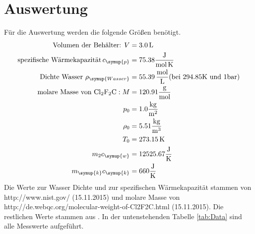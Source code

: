 \section{Auswertung}
\label{sec:Auswertung}
Für die Auswertung werden die folgende Größen benötigt.
\begin{align*}
  \text{Volumen der Behälter: } V &= 3.0 \,\si{\liter} \\
  \text{spezifische Wärmekapazität}\, c_\symup{p} &= 75.38\si{\frac{\joule}{\mol\,\kelvin}}  \\
  \text{Dichte Wasser } \rho_\symup{Wasser} &= 55.39 \,\si{\frac{\mol}{\liter}}
        (\text{bei } 294.85 \si{\kelvin} \text{ und } 1\si{\bar}) \\
  \text{molare Masse von } \ce{Cl2F2C}: M &= 120.91 \si{\frac{\gram}{\mol}} \\
  p_0 &= 1.0 \si{\frac{\kilo\gram}{\meter^2}}  \\
  \rho_0 &= 5.51  \si{\frac{\kilo\gram}{\meter^3}} \\
  T_0 &= 273.15 \,  \si{\kelvin}  \\
  m_2c_\symup{w} &= 12525.67 \si{\frac{\joule}{\kelvin}} \\
  m_\symup{k}c_\symup{k} &= 660   \si{\frac{\joule}{\kelvin}}
\end{align*}
Die Werte zur Wasser Dichte und zur spezifischen Wärmekapazität stammen von
http://www.nist.gov/ (15.11.2015) und molare Masse von http://de.webqc.org/molecular-weight-of-Cl2F2C.html (15.11.2015).
Die restlichen Werte stammen aus \cite{sample}.
In der untenstehenden Tabelle \ref{tab:Data} sind alle Messwerte aufgeführt.
